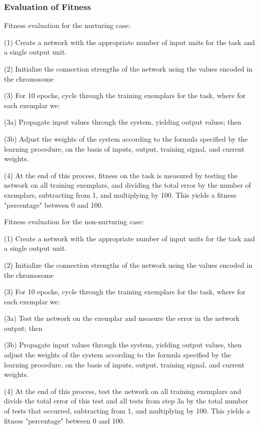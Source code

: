 \documentclass[master]{outhesis}
\begin{document}
\subsubsection{Evaluation of Fitness}

Fitness evaluation for the nurturing case:

(1) Create a network with the appropriate number of input units for the task and a single output unit.

(2) Initialize the connection strengths of the network using the values encoded in the chromosome

(3) For 10 epochs, cycle through the training exemplars for the task, where for each exemplar we:

(3a) Propagate input values through the system, yielding output values; then

(3b) Adjust the weights of the system according to the formula specified by the learning procedure, on the basis of inputs, output, training signal, and current weights.

(4) At the end of this process, fitness on the task is measured by testing the network on all training exemplars, and dividing the total error by the number of exemplars, subtracting from 1, and multiplying by 100. This yields a fitness "percentage" between 0 and 100.

Fitness evaluation for the non-nurturing case:

(1) Create a network with the appropriate number of input units for the task and a single output unit.

(2) Initialize the connection strengths of the network using the values encoded in the chromosome

(3) For 10 epochs, cycle through the training exemplars for the task, where for each exemplar we:

(3a) Test the network on the exemplar and measure the error in the network output; then

(3b) Propagate input values through the system, yielding output values, then adjust the weights of the system according to the formula specified by the learning procedure, on the basis of inputs, output, training signal, and current weights.

(4) At the end of this process, test the network on all training exemplars and divide the total error of this test and all tests from step 3a by the total number of tests that occurred, subtracting from 1, and multiplying by 100. This yields a fitness "percentage" between 0 and 100.
\end{document}
